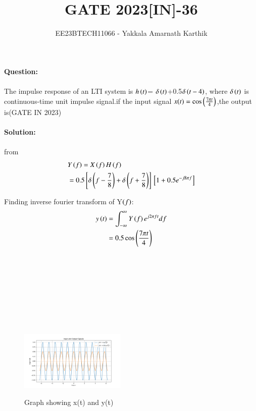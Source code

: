 \documentclass[journal,12pt,twocolumn]{IEEEtran}
\begin{document}


\title{GATE 2023[IN]-36}
\author{EE23BTECH11066 - Yakkala Amarnath Karthik}
\maketitle

\textbf{Question:}\\ \\
The impulse response of an LTI system is $h\left(t\right)$= $\delta\left(t\right)$+0.5$ \delta\left(t-4\right)$, where $\delta\left(t\right)$ is continuous-time unit impulse signal.if the input signal $x(t)=\cos\left(\frac{7\pi t}{4}\right)$,the output is\hfill(GATE IN 2023)\\ \\

\textbf{Solution:}\\
\\
from 
\begin{align}
    &Y\left(f\right) = X\left(f\right)H\left(f\right)\\
   &=0.5{}\left[\delta \left(f-\frac{7}{8}\right)+\delta \left(f+\frac{7}{8}\right)\right]{}\left[1+0.5e^{-j8\pi f}\right]
\end{align}

Finding inverse fourier transform of Y$\left(f\right)$:
\begin{align}
    y\left(t\right)&=\int_{-\infty}^{\infty}Y\left(f\right)e^{j2\pi ft}df\\
    &=0.5\cos\left({\frac{7\pi t}{4}}\right)
\end{align}


  \begin{figure}[ht]
        \hspace{3cm} \\ \\ \\ \\ \\ \\ \\ \\\includegraphics[width=0.45\textwidth]{figs/pythongate.png}
        \caption{Graph showing x(t) and y(t)}
    \end{figure} 
\end{document}
